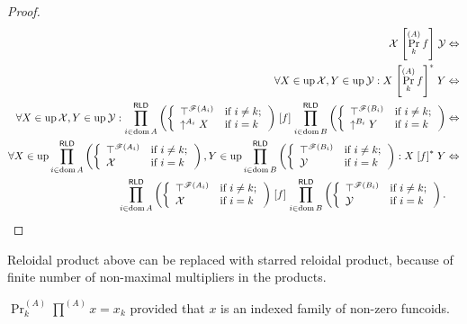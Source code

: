 \begin{proof}
~
\begin{align*}
\mathcal{X}\mathrel{\left[\Pr_{k}^{(A)}f\right]}\mathcal{Y} & \Leftrightarrow\\
\forall X\in\operatorname{up}\mathcal{X},Y\in\operatorname{up}\mathcal{Y}:X\mathrel{\left[\Pr_{k}^{(A)}f\right]^{\ast}}Y & \Leftrightarrow\\
\forall X\in\operatorname{up}\mathcal{X},Y\in\operatorname{up}\mathcal{Y}:\prod_{i\in\operatorname{dom} A}^{\mathsf{RLD}}\left(\left\{ \begin{array}{ll}
\top^{\mathscr{F}(A_{i})} & \text{if }i\neq k;\\
\uparrow^{A_{i}}X & \text{if }i=k
\end{array}\right.\right)\mathrel{\left[f\right]}\prod_{i\in\operatorname{dom} B}^{\mathsf{RLD}}\left(\left\{ \begin{array}{ll}
\top^{\mathscr{F}(B_{i})} & \text{if }i\neq k;\\
\uparrow^{B_{i}}Y & \text{if }i=k
\end{array}\right.\right) & \Leftrightarrow\\
\forall X\in\operatorname{up}\prod_{i\in\operatorname{dom} A}^{\mathsf{RLD}}\left(\left\{ \begin{array}{ll}
\top^{\mathscr{F}(A_{i})} & \text{if }i\neq k;\\
\mathcal{X} & \text{if }i=k
\end{array}\right.\right),Y\in\operatorname{up}\prod_{i\in\operatorname{dom} B}^{\mathsf{RLD}}\left(\left\{ \begin{array}{ll}
\top^{\mathscr{F}(B_{i})} & \text{if }i\neq k;\\
\mathcal{Y} & \text{if }i=k
\end{array}\right.\right):X\mathrel{\left[f\right]^{\ast}}Y & \Leftrightarrow\\
\prod_{i\in\operatorname{dom} A}^{\mathsf{RLD}}\left(\left\{ \begin{array}{ll}
\top^{\mathscr{F}(A_{i})} & \text{if }i\neq k;\\
\mathcal{X} & \text{if }i=k
\end{array}\right.\right)\mathrel{\left[f\right]}\prod_{i\in\operatorname{dom} B}^{\mathsf{RLD}}\left(\left\{ \begin{array}{ll}
\top^{\mathscr{F}(B_{i})} & \text{if }i\neq k;\\
\mathcal{Y} & \text{if }i=k
\end{array}\right.\right).
\end{align*}
\end{proof}
\begin{rem}
Reloidal product above can be replaced with starred reloidal product,
because of finite number of non-maximal multipliers in the products.\end{rem}
\begin{obvious}
$\Pr_{k}^{(A)}\prod^{(A)}x=x_{k}$ provided that $x$ is an indexed
family of non-zero funcoids.
\end{obvious}

